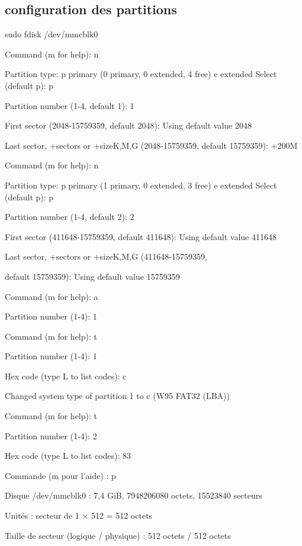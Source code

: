 \subsection{configuration des partitions}

sudo fdisk /dev/mmcblk0



Command (m for help): n

Partition type: p primary (0 primary, 0 extended, 4 free) e extended Select (default p): p

Partition number (1-4, default 1): 1

First sector (2048-15759359, default 2048): Using default value 2048

Last sector, +sectors or +size{K,M,G} (2048-15759359, default 15759359): +200M



Command (m for help): n

Partition type: p primary (1 primary, 0 extended, 3 free) e extended Select (default p): p

Partition number (1-4, default 2): 2

First sector (411648-15759359, default 411648): Using default value 411648

Last sector, +sectors or +size{K,M,G} (411648-15759359,

default 15759359): Using default value 15759359





Command (m for help): a

Partition number (1-4): 1



Command (m for help): t

Partition number (1-4): 1

Hex code (type L to list codes): c

Changed system type of partition 1 to c (W95 FAT32 (LBA))



Command (m for help): t

Partition number (1-4): 2

Hex code (type L to list codes): 83



Commande (m pour l'aide) : p

Disque /dev/mmcblk0 : 7,4 GiB, 7948206080 octets, 15523840 secteurs

Unités : secteur de 1 × 512 = 512 octets

Taille de secteur (logique / physique) : 512 octets / 512 octets

